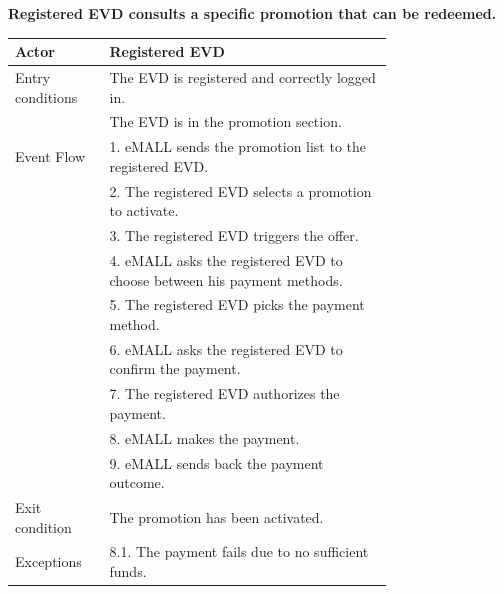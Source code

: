 \textbf{Registered EVD consults a specific promotion that can be redeemed.}
\begin{center}
    \begin{longtable}{lp{0.75\linewidth}}
        \hline
        Actor            & Registered EVD                                                                                                        \\
        \hline
        Entry conditions & The EVD is registered and correctly logged in.                                                                        \\
        & The EVD is in the promotion section.                                                                                  \\
        \hline
        Event Flow       & 1. eMALL sends the promotion list to the registered EVD.                                                              \\
        & 2. The registered EVD selects a promotion to activate.                                                                \\
        & 3. The registered EVD triggers the offer.                                                                             \\
        & 4. eMALL asks the registered EVD to choose between his payment methods.                                               \\
        & 5. The registered EVD picks the payment method.                                                                       \\
        & 6. eMALL asks the registered EVD to confirm the payment.                                                              \\
        & 7. The registered EVD authorizes the payment.                                                                         \\
        & 8. eMALL makes the payment.                                                                                           \\
        & 9. eMALL sends back the payment outcome.                                                                              \\
        \hline
        Exit condition   & The promotion has been activated.                                                                                     \\
        \hline
        Exceptions       & 8.1. The payment fails due to no sufficient funds.                                                                    \\

\end{longtable}
\end{center}
